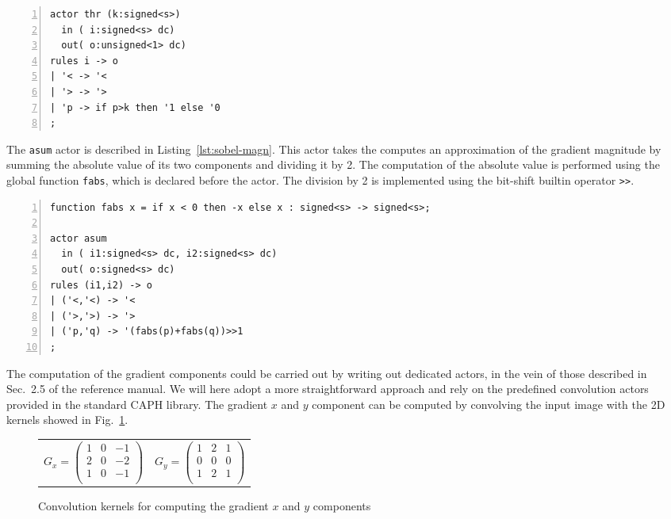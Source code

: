 \begin{lstlisting}[style=CaphStyle,numbers=left,numberstyle=\tiny,caption={The \texttt{thr} actor in
    Caph},label={lst:sobel-thr}]
actor thr (k:signed<s>)
  in ( i:signed<s> dc)
  out( o:unsigned<1> dc)
rules i -> o
| '< -> '<
| '> -> '>
| 'p -> if p>k then '1 else '0
;
\end{lstlisting}

\medskip The \verb|asum| actor is described in Listing~\ref{lst:sobel-magn}. This actor takes the
computes an approximation of the gradient magnitude by summing the absolute value of its two
components and dividing it by 2. The computation of the absolute value is
performed using the global function \verb|fabs|, which is declared before the actor.  The division
by 2 is implemented using the bit-shift builtin operator \verb|>>|.

\begin{lstlisting}[style=CaphStyle,numbers=left,numberstyle=\tiny,caption={The \texttt{asum} actor in
    Caph},label={lst:sobel-magn}]
function fabs x = if x < 0 then -x else x : signed<s> -> signed<s>;

actor asum
  in ( i1:signed<s> dc, i2:signed<s> dc)
  out( o:signed<s> dc)
rules (i1,i2) -> o
| ('<,'<) -> '<
| ('>,'>) -> '>
| ('p,'q) -> '(fabs(p)+fabs(q))>>1
;
\end{lstlisting}

\medskip
The computation of the gradient components could be carried out by writing out dedicated actors, in the
vein of those described in Sec.~2.5 of the reference manual. We will here adopt a more straightforward
approach and rely on the predefined convolution actors provided in the standard CAPH library. The
gradient $x$ and $y$ component can be computed by convolving the input image with the 2D kernels
showed in Fig.~\ref{fig:sobel-kernels}.

\begin{figure}[h]
\centering
  \begin{tabular}[c]{cc}
$ G_x = \begin{pmatrix}
      1 & 0 & -1 \\
      2 & 0 & -2 \\
      1 & 0 & -1 \\
    \end{pmatrix} $ &
$ G_y = \begin{pmatrix}
      1 & 2 & 1 \\
      0 & 0 & 0 \\
      1 & 2 & 1 \\
    \end{pmatrix} $
  \end{tabular}
  \caption{Convolution kernels for computing the gradient $x$ and $y$ components}
  \label{fig:sobel-kernels}
\end{figure}


